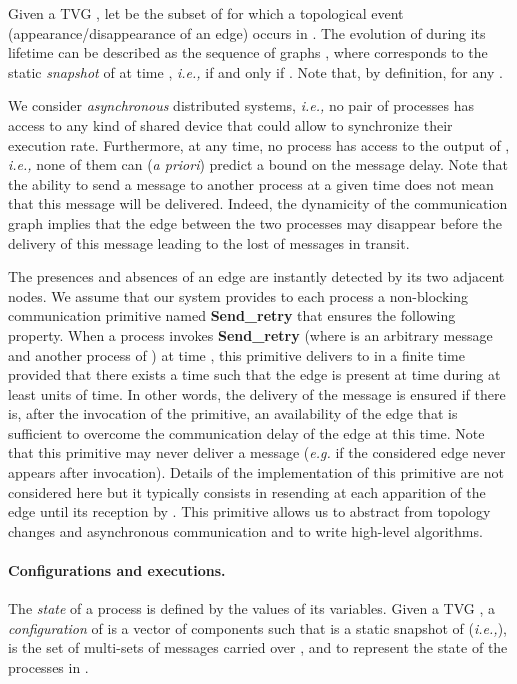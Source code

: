 \documentclass[11pt]{article}
\newcommand{\ie}{{\em i.e.,}\xspace}
\begin{document}
Given a TVG , let  be the subset of  for which a topological event (appearance/disappearance of an edge) occurs in . The evolution of  during its lifetime  can be described as the sequence of graphs , where  corresponds to the static {\em snapshot} of  at time , \ie  if and only if . Note that, by definition,  for any . 

We consider {\em asynchronous} distributed systems, \ie no pair of processes has access to any kind of shared device that could allow to synchronize their execution rate.  Furthermore, at any time, no process has access to the output of , \ie none of them can ({\em a priori}) predict a bound on the message delay. Note that the ability to send a message to another process at a given time does not mean that this message will be delivered. Indeed, the dynamicity of the communication graph implies that the edge between the two processes may disappear before the delivery of this message leading to the lost of messages in transit. 

The presences and absences of an edge are instantly detected by its two adjacent nodes. We assume that our system provides to each process a non-blocking communication primitive named \textbf{Send\_retry} that ensures the following property. When a process  invokes \textbf{Send\_retry} (where  is an arbitrary message and  another process of ) at time , this primitive delivers  to  in a finite time provided that there exists a time  such that the edge  is present at time  during at least  units of time. In other words, the delivery of the message is ensured if there is, after the invocation of the primitive, an availability of the edge that is sufficient to overcome the communication delay of the edge at this time. Note that this primitive may never deliver a message (\emph{e.g.} if the considered edge never appears after invocation). Details of the implementation of this primitive are not considered here but it typically consists in resending  at each apparition of the edge  until its reception by . This primitive allows us to abstract from topology changes and asynchronous communication and to write high-level algorithms.

\paragraph{Configurations and executions.} The \emph{state} of a process is defined by the values of its variables. Given a TVG , a \emph{configuration} of  is a vector of  components  such that  is a static snapshot of  (\ie ),  is the set of multi-sets of messages carried over , and  to  represent the state of the  processes in . 
\end{document}
